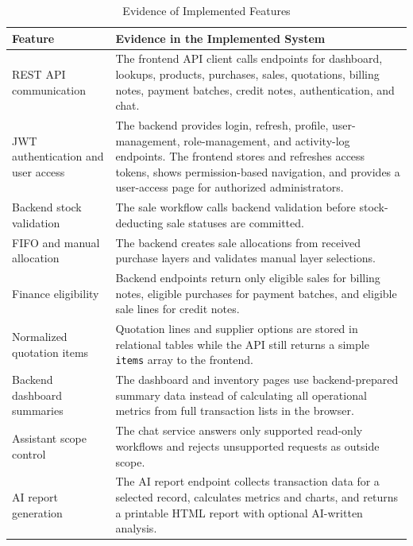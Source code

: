 \begin{table}[H]
	\centering
	\BlackbookTableSetup
	\caption{Evidence of Implemented Features}
	\label{tab:feature-evidence-summary}
	\begin{tabularx}{\textwidth}{|B{3.4cm}|Z|}
		\hline
		\textbf{Feature} & \textbf{Evidence in the Implemented System} \\ \hline
		REST API communication & The frontend API client calls endpoints for dashboard, lookups, products, purchases, sales, quotations, billing notes, payment batches, credit notes, authentication, and chat. \\ \hline
		JWT authentication and user access & The backend provides login, refresh, profile, user-management, role-management, and activity-log endpoints. The frontend stores and refreshes access tokens, shows permission-based navigation, and provides a user-access page for authorized administrators. \\ \hline
		Backend stock validation & The sale workflow calls backend validation before stock-deducting sale statuses are committed. \\ \hline
		FIFO and manual allocation & The backend creates sale allocations from received purchase layers and validates manual layer selections. \\ \hline
		Finance eligibility & Backend endpoints return only eligible sales for billing notes, eligible purchases for payment batches, and eligible sale lines for credit notes. \\ \hline
		Normalized quotation items & Quotation lines and supplier options are stored in relational tables while the API still returns a simple \texttt{items} array to the frontend. \\ \hline
		Backend dashboard summaries & The dashboard and inventory pages use backend-prepared summary data instead of calculating all operational metrics from full transaction lists in the browser. \\ \hline
		Assistant scope control & The chat service answers only supported read-only workflows and rejects unsupported requests as outside scope. \\ \hline
		AI report generation & The AI report endpoint collects transaction data for a selected record, calculates metrics and charts, and returns a printable HTML report with optional AI-written analysis. \\ \hline
	\end{tabularx}
\end{table}

